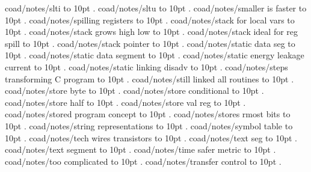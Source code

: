 \smallskip
coad/notes/slti \leaders\hbox to 10pt {\hss.\hss}  \hfill {}
\smallskip
coad/notes/sltu \leaders\hbox to 10pt {\hss.\hss}  \hfill {}
\smallskip
coad/notes/smaller is faster \leaders\hbox to 10pt {\hss.\hss}  \hfill {}
\smallskip
coad/notes/spilling registers \leaders\hbox to 10pt {\hss.\hss}  \hfill {}
\smallskip
coad/notes/stack for local vars \leaders\hbox to 10pt {\hss.\hss}  \hfill {}
\smallskip
coad/notes/stack grows high low \leaders\hbox to 10pt {\hss.\hss}  \hfill {}
\smallskip
coad/notes/stack ideal for reg spill \leaders\hbox to 10pt {\hss.\hss}  \hfill {}
\smallskip
coad/notes/stack pointer \leaders\hbox to 10pt {\hss.\hss}  \hfill {}
\smallskip
coad/notes/static data seg \leaders\hbox to 10pt {\hss.\hss}  \hfill {}
\smallskip
coad/notes/static data segment \leaders\hbox to 10pt {\hss.\hss}  \hfill {}
\smallskip
coad/notes/static energy leakage current \leaders\hbox to 10pt {\hss.\hss}  \hfill {}
\smallskip
coad/notes/static linking disadv \leaders\hbox to 10pt {\hss.\hss}  \hfill {}
\smallskip
coad/notes/steps transforming C program \leaders\hbox to 10pt {\hss.\hss}  \hfill {}
\smallskip
coad/notes/still linked all routines \leaders\hbox to 10pt {\hss.\hss}  \hfill {}
\smallskip
coad/notes/store byte \leaders\hbox to 10pt {\hss.\hss}  \hfill {}
\smallskip
coad/notes/store conditional \leaders\hbox to 10pt {\hss.\hss}  \hfill {}
\smallskip
coad/notes/store half \leaders\hbox to 10pt {\hss.\hss}  \hfill {}
\smallskip
coad/notes/store val reg \leaders\hbox to 10pt {\hss.\hss}  \hfill {}
\smallskip
coad/notes/stored program concept \leaders\hbox to 10pt {\hss.\hss}  \hfill {}
\smallskip
coad/notes/stores rmost bits \leaders\hbox to 10pt {\hss.\hss}  \hfill {}
\smallskip
coad/notes/string representations \leaders\hbox to 10pt {\hss.\hss}  \hfill {}
\smallskip
coad/notes/symbol table \leaders\hbox to 10pt {\hss.\hss}  \hfill {}
\smallskip
coad/notes/tech wires transistors \leaders\hbox to 10pt {\hss.\hss}  \hfill {}
\smallskip
coad/notes/text seg \leaders\hbox to 10pt {\hss.\hss}  \hfill {}
\smallskip
coad/notes/text segment \leaders\hbox to 10pt {\hss.\hss}  \hfill {}
\smallskip
coad/notes/time safer metric \leaders\hbox to 10pt {\hss.\hss}  \hfill {}
\smallskip
coad/notes/too complicated \leaders\hbox to 10pt {\hss.\hss}  \hfill {}
\smallskip
coad/notes/transfer control \leaders\hbox to 10pt {\hss.\hss}  \hfill {}
